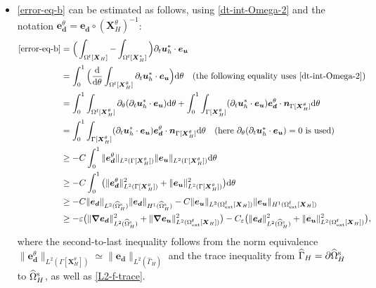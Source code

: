 \documentclass[11pt,reqno]{amsart}
\theoremstyle{definition}
\theoremstyle{plain}
\numberwithin{theorem}{section}
\numberwithin{proposition}{section}
\numberwithin{lemma}{section}
\numberwithin{equation}{section}
\newcommand{\bs}[1]{\boldsymbol{#1}}
\newcommand{\uu}[1]  {{\bs{#1}} }
\newcommand{\dep}{{{\bs{d}}}}
\newcommand{\grad}   { \uu{\nabla}    }
\def\d{\mathrm{d}}
\renewcommand{\(}{\bigl(}
\renewcommand{\)}{\bigr)}
\begin{document}
\begin{itemize}[leftmargin=20pt]
\item \eqref{error-eq-b} can be estimated as follows, using \eqref{dt-int-Omega-2} and the notation ${\bs e}_{\bs d}^\theta={\bs e}_{\bs d}\circ({\bs X}_H^\theta)^{-1}$:  
\begin{align}
\eqref{error-eq-b} &=\Big( \int_{\Omega^{\rm f}[\bs X_H]} - \int_{\Omega^{\rm f}[\bs X_H^*]} \Big) \partial_t {\bs u}_h^* \cdot {\bs e}_{\bs u} \notag\\
&= \int_0^{1} \Big( \frac{\d}{\d\theta}\int_{\Omega^{\rm f}[\bs X_H^\theta]}\partial_t {\bs u}_h^* \cdot{\bs e}_{\bs u} \Big) \d\theta \quad\mbox{(the following equality uses \eqref{dt-int-Omega-2})}\notag\\
&= \int_0^{1} \int_{\Omega^{\rm f}[\bs X_H^\theta]} \partial_\theta( \partial_t {\bs u}_h^* \cdot {\bs e}_{\bs u} ) \d\theta
+ \int_0^{1} \int_{\Gamma[\bs X_H^\theta]} (\partial_t {\bs u}_h^* \cdot {\bs e}_{\bs u} ) {\bs e}_\dep^\theta \cdot {\bs n}_{\Gamma[\bs X_H^\theta]} \d\theta \notag\\
&= \int_0^{1} \int_{\Gamma[\bs X_H^\theta]} (\partial_t {\bs u}_h^* \cdot {\bs e}_{\bs u} ) {\bs e}_\dep^\theta \cdot {\bs n}_{\Gamma[\bs X_H^\theta]} \d\theta \quad\mbox{(here $\partial_\theta( \partial_t {\bs u}_h^* \cdot {\bs e}_{\bs u} )=0$ is used)} \notag \\
&\ge - C\int_0^{1}  \|{\bs e}_\dep^\theta\|_{L^2(\Gamma[\bs X_H^\theta])} \|{\bs e}_{\bs u}\|_{L^2(\Gamma[\bs X_H^\theta])} \d\theta \notag\\
&\ge - C\int_0^{1}\big( \|{\bs e}_\dep^\theta\|_{L^2(\Gamma[\bs X_H^\theta])}^2 + \|{\bs e}_{\bs u}\|_{L^2(\Gamma[\bs X_H^\theta])}^2 \big) \d\theta \notag\\
&\ge - C \|{\bs e}_\dep\|_{L^2(\widehat{\Omega}^{\rm s}_H)} \|{\bs e}_\dep\|_{H^1(\widehat{\Omega}^{\rm s}_H)}  
- C \|{\bs e}_{\bs u}\|_{L^2(\Omega^{\rm f}_{\rm ext}[\bs X_H])} \|{\bs e}_{\bs u}\|_{H^1(\Omega^{\rm f}_{\rm ext}[\bs X_H])} \notag \\
&\ge - \varepsilon  \big( \|\grad {\bs e}_\dep\|_{L^2(\widehat{\Omega}^{\rm s}_H)}^2 +  \|\grad {\bs e}_{\bs u}\|_{L^2(\Omega^{\rm f}_{\rm ext}[\bs X_H])}^2 \big) 
- C_{\varepsilon} \big(\|{\bs e}_\dep\|_{L^2(\widehat{\Omega}^{\rm s}_H)}^2 + \|{\bs e}_{\bs u}\|_{L^2(\Omega^{\rm f}_{\rm ext}[\bs X_H])}^2 \big) , \label{eq:estim2}
\end{align}
where the second-to-last inequality follows from the norm equivalence $\|{\bs e}_\dep^\theta\|_{L^2(\Gamma[\bs X_H^\theta])}\simeq \|{\bs e}_\dep\|_{L^2(\widehat\Gamma_H)}$ and the trace inequality from $\widehat\Gamma_H=\partial\widehat{\Omega}^{\rm s}_H$ to $\widehat{\Omega}^{\rm s}_H$, as well as \eqref{L2-f-trace}. 


\end{itemize}
\end{document}
